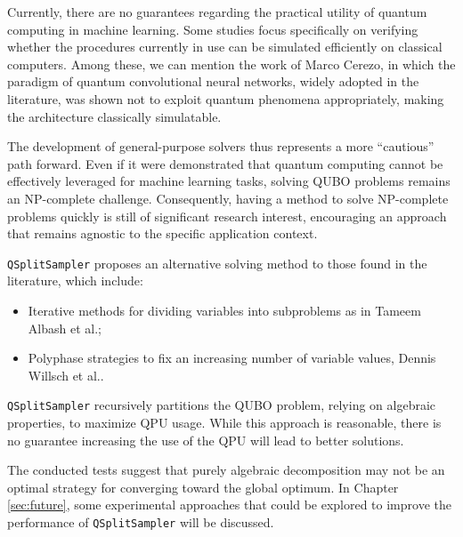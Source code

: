Currently, there are no guarantees regarding the practical utility of quantum computing in machine learning. 
Some studies focus specifically on verifying whether the procedures currently in use can be simulated efficiently on classical computers. 
Among these, we can mention the work of Marco Cerezo\cite{qcnn}, in which the paradigm of quantum convolutional neural networks, widely adopted in the literature, was shown not to exploit quantum phenomena appropriately, making the architecture classically simulatable.

The development of general-purpose solvers thus represents a more ``cautious'' path forward. 
Even if it were demonstrated that quantum computing cannot be effectively leveraged for machine learning tasks, solving QUBO problems remains an NP-complete challenge. 
Consequently, having a method to solve NP-complete problems quickly is still of significant research interest, encouraging an approach that remains agnostic to the specific application context.

\texttt{QSplitSampler} proposes an alternative solving method to those found in the literature, which include:
\begin{itemize}
    \item Iterative methods for dividing variables into subproblems as in Tameem Albash et al.\cite{subqubo2};
    \item Polyphase strategies to fix an increasing number of variable values, Dennis Willsch et al.\cite{subqubo1}.
\end{itemize}

\texttt{QSplitSampler} recursively partitions the QUBO problem, relying on algebraic properties, to maximize QPU usage. 
While this approach is reasonable, there is no guarantee increasing the use of the QPU will lead to better solutions.

The conducted tests suggest that purely algebraic decomposition may not be an optimal strategy for converging toward the global optimum. 
In Chapter \ref{sec:future}, some experimental approaches that could be explored to improve the performance of \texttt{QSplitSampler} will be discussed.